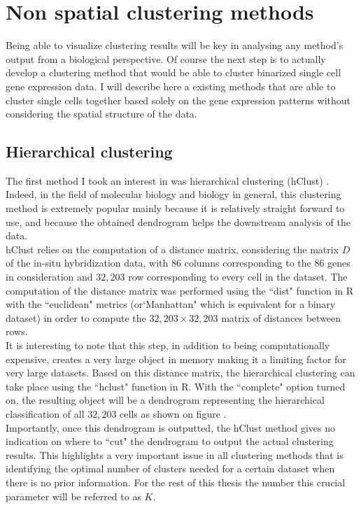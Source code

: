 \section{Non spatial clustering methods}
Being able to visualize clustering results will be key in analysing any method's output from a biological perspective. Of course the next step is to actually develop a clustering method that would be able to cluster binarized single cell gene expression data. I will describe here a existing methods that are able to cluster single cells together based solely on the gene expression patterns without considering the spatial structure of the data.
	\subsection{Hierarchical clustering}
	The first method I took an interest in was hierarchical clustering (hClust) \cite{johnson67}. Indeed, in the field of molecular biology and biology in general, this clustering method is extremely popular mainly because it is relatively straight forward to use, and because the obtained dendrogram helps the downstream analysis of the data.\\
	
	hClust relies on the computation of a distance matrix, considering the matrix $D$ of the in-situ hybridization data, with $86$ columns corresponding to the 86 genes in consideration and $32,203$ row corresponding to every cell in the dataset. The computation of the distance matrix was performed using the ``dist" function in R with the ``euclidean" metrics (or`Manhattan" which is equivalent for a binary dataset) in order to compute the $32,203 \times 32,203$ matrix of distances between rows.\\
	
	It is interesting to note that this step, in addition to being computationally expensive, creates a very large object in memory making it a limiting factor for very large datasets. Based on this distance matrix, the hierarchical clustering can take place using the ``hclust" function in R. With the ``complete" option turned on, the resulting object will be a dendrogram  representing the hierarchical classification of all $32,203$ cells as shown on figure .\\
	
	Importantly, once this dendrogram is outputted, the hClust method gives no indication on where to ``cut" the dendrogram to output the actual clustering results. This highlights a very important issue in all clustering methods that is identifying the optimal number of clusters needed for a certain dataset when there is no prior information. For the rest of this thesis the number this crucial parameter will be referred to as $K$.\\
	
